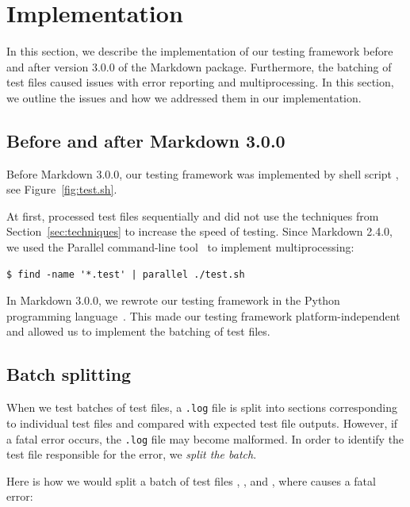 \documentclass[final]{ltugboat}
\begin{document}
\section{Implementation}
\label{sec:implementation}
In this section, we describe the implementation of our testing framework before and after version 3.0.0 of the Markdown package. Furthermore, the batching of test files caused issues with error reporting and multiprocessing. In this section, we outline the issues and how we addressed them in our implementation.

\subsection{Before and after Markdown 3.0.0}

Before Markdown 3.0.0, our testing framework was implemented by shell script , see Figure~\ref{fig:test.sh}.

At first,  processed test files sequentially and did not use the techniques from Section~\ref{sec:techniques} to increase the speed of testing. Since Markdown 2.4.0, we used the  Parallel command-line tool~\cite{tange2011gnu} to implement multiprocessing:

\begin{verbatim}
$ find -name '*.test' | parallel ./test.sh
\end{verbatim}

In Markdown 3.0.0, we rewrote our testing framework in the Python programming language~\cite{novotny2023implement}. This made our testing framework platform-independent and allowed us to implement the batching of test files.

\subsection{Batch splitting}

When we test batches of test files, a \texttt{.log} file is split into sections corresponding to individual test files and compared with expected test file outputs. However, if a fatal error occurs, the \texttt{.log} file may become malformed. In order to identify the test file responsible for the error, we \emph{split the batch}.

Here is how we would split a batch of test files , , and , where  causes a fatal error:
\end{document}
